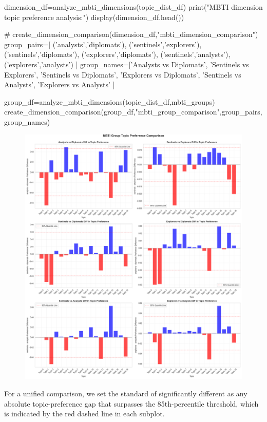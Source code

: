 \documentclass[12pt]{article}
\numberwithin{figure}{section}  %
\begin{document}
\begin{python}
dimension_df=analyze_mbti_dimensions(topic_dist_df)
print("MBTI dimension topic preference analysis:")
display(dimension_df.head())

# create_dimension_comparison(dimension_df,"mbti_dimension_comparison")
group_pairs=[
            ('analysts','diplomats'),
            ('sentinels','explorers'),
            ('sentinels','diplomats'),
            ('explorers','diplomats'),
            ('sentinels','analysts'),
            ('explorers','analysts')
             ]
group_names=['Analysts vs Diplomats',
             'Sentinels vs Explorers',
             'Sentinels vs Diplomats',
             'Explorers vs Diplomats',
             'Sentinels vs Analysts',
             'Explorers vs Analysts'
             ]

group_df=analyze_mbti_dimensions(topic_dist_df,mbti_groups)
create_dimension_comparison(group_df,"mbti_group_comparison",group_pairs,group_names)
	\end{python}
	\begin{figure}[H]
			\centering
			\includegraphics[width=1\textwidth]{Q2grouppre} 	
	\end{figure}
	
	For a unified comparison, we set the standard of significantly different as
	any absolute topic-preference gap that surpasses the 85th-percentile
	threshold, which is indicated by the red dashed line in each subplot.
	
\end{document}
